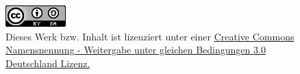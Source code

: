 \documentclass[12pt,ngerman,twopage]{scrartcl}
\begin{document}
\begin{figure}[h]
\begin{center}
\href{http://creativecommons.org/licenses/by-sa/3.0/de/}{\includegraphics{cc-by-sa.png}}\\
Dieses Werk bzw. Inhalt ist lizenziert unter einer \href{http://creativecommons.org/licenses/by-sa/3.0/de/}{Creative Commons Namensnennung - Weitergabe unter gleichen Bedingungen 3.0 Deutschland Lizenz.}
\end{center}
\end{figure}
\end{document}
